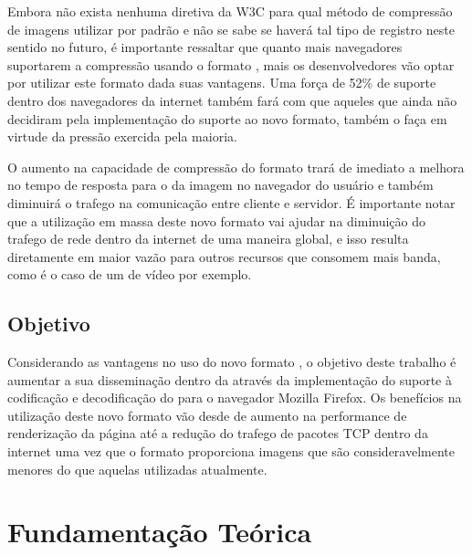 \documentclass[espaco=simples,appendix=Name]{abnt}
\begin{document}
\begin{description}
Embora não exista nenhuma diretiva da W3C para qual método de compressão de imagens utilizar por padrão e não se sabe se haverá tal tipo de registro neste sentido no futuro, é importante ressaltar que quanto mais navegadores suportarem a compressão usando o formato , mais os desenvolvedores vão optar por utilizar este formato dada suas vantagens. Uma força de 52\% de suporte dentro dos navegadores da internet também fará com que aqueles que ainda não decidiram pela implementação do suporte ao novo formato, também o faça em virtude da pressão exercida pela maioria.

O aumento na capacidade de compressão do formato  trará de imediato a melhora no tempo de resposta para o  da imagem no navegador do usuário e também diminuirá o trafego na comunicação entre cliente e servidor. É importante notar que a utilização em massa deste novo formato vai ajudar na diminuição do trafego de rede dentro da internet de uma maneira global, e isso resulta diretamente em maior vazão para outros recursos que consomem mais banda, como é o caso de um  de vídeo por exemplo.

\section{Objetivo}

\item \noindent
Considerando as vantagens no uso do novo formato , o objetivo deste trabalho é aumentar a sua disseminação dentro da  através da implementação do suporte à codificação e decodificação do  para o navegador Mozilla Firefox. Os benefícios na utilização deste novo formato vão desde de aumento na performance de renderização da página até a redução do trafego de pacotes TCP dentro da internet uma vez que o formato  proporciona imagens que são consideravelmente menores do que aquelas utilizadas atualmente. 

\end{description}

\chapter{Fundamentação Teórica}
\end{document}
